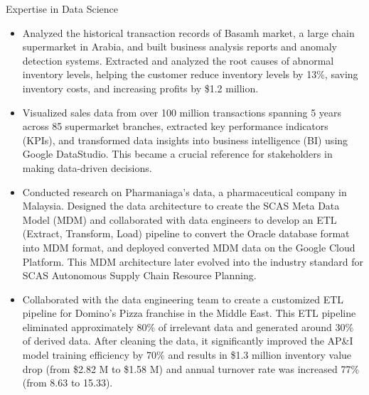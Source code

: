 \documentclass[margin, 10pt]{res} %
\begin{document}
\begin{resume}
\begin{itemize}
\end{itemize}
\textrm{Expertise in Data Science}
\begin{itemize}
    \item Analyzed the historical transaction records of Basamh market, a large chain supermarket in Arabia, and built business analysis reports and anomaly detection systems. Extracted and analyzed the root causes of abnormal inventory levels, helping the customer reduce inventory levels by 13\%, saving inventory costs, and increasing profits by \$1.2 million.
    \item Visualized sales data from over 100 million transactions spanning 5 years across 85 supermarket branches, extracted key performance indicators (KPIs), and transformed data insights into business intelligence (BI) using Google DataStudio. This became a crucial reference for stakeholders in making data-driven decisions.
    \item Conducted research on Pharmaniaga's data, a pharmaceutical company in Malaysia. Designed the data architecture to create the SCAS Meta Data Model (MDM) and collaborated with data engineers to develop an ETL (Extract, Transform, Load) pipeline to convert the Oracle database format into MDM format, and deployed converted MDM data on the Google Cloud Platform. This MDM architecture later evolved into the industry standard for SCAS Autonomous Supply Chain Resource Planning.  
    \item Collaborated with the data engineering team to create a customized ETL pipeline for Domino's Pizza franchise in the Middle East. This ETL pipeline eliminated approximately 80\% of irrelevant data and generated around 30\% of derived data. After cleaning the data, it significantly improved the AP\&I model training efficiency by 70\% and results in \$1.3 million inventory value drop (from \$2.82 M to \$1.58 M) and annual turnover rate was increased 77\% (from 8.63 to 15.33).

\end{itemize}
\end{resume}
\end{document}
